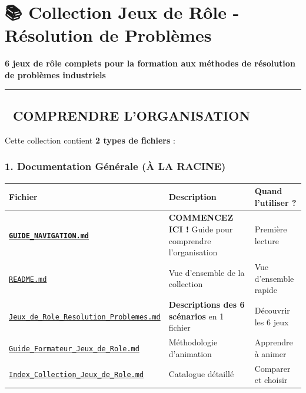 \documentclass[
]{article}
\author{}
\date{\vspace{-2.5em}}
\begin{document}
\section{📚 Collection Jeux de Rôle - Résolution de
Problèmes}\label{collection-jeux-de-ruxf4le---ruxe9solution-de-probluxe8mes}

\textbf{6 jeux de rôle complets pour la formation aux méthodes de
résolution de problèmes industriels}

\begin{center}\rule{0.5\linewidth}{0.5pt}\end{center}

\subsection{📖 COMPRENDRE
L'ORGANISATION}\label{comprendre-lorganisation}

Cette collection contient \textbf{2 types de fichiers} :

\subsubsection{1. Documentation Générale (À LA
RACINE)}\label{documentation-guxe9nuxe9rale-uxe0-la-racine}

\begin{longtable}[]{@{}
  >{\raggedright\arraybackslash}p{}
  >{\raggedright\arraybackslash}p{}
  >{\raggedright\arraybackslash}p{}@{}}
\toprule\noalign{}
\begin{minipage}[b]{\linewidth}\raggedright
Fichier
\end{minipage} & \begin{minipage}[b]{\linewidth}\raggedright
Description
\end{minipage} & \begin{minipage}[b]{\linewidth}\raggedright
Quand l'utiliser ?
\end{minipage} \\
\midrule\noalign{}
\endhead
\bottomrule\noalign{}
\endlastfoot
\textbf{\href{./GUIDE_NAVIGATION.md}{\texttt{GUIDE\_NAVIGATION.md}}} 🔑
& \textbf{COMMENCEZ ICI !} Guide pour comprendre l'organisation &
Première lecture \\
\href{./README.md}{\texttt{README.md}} & Vue d'ensemble de la collection
& Vue d'ensemble rapide \\
\href{./Jeux_de_Role_Resolution_Problemes.md}{\texttt{Jeux\_de\_Role\_Resolution\_Problemes.md}}
& \textbf{Descriptions des 6 scénarios} en 1 fichier & Découvrir les 6
jeux \\
\href{./Guide_Formateur_Jeux_de_Role.md}{\texttt{Guide\_Formateur\_Jeux\_de\_Role.md}}
& Méthodologie d'animation & Apprendre à animer \\
\href{./Index_Collection_Jeux_de_Role.md}{\texttt{Index\_Collection\_Jeux\_de\_Role.md}}
& Catalogue détaillé & Comparer et choisir \\
\end{longtable}
\end{document}
